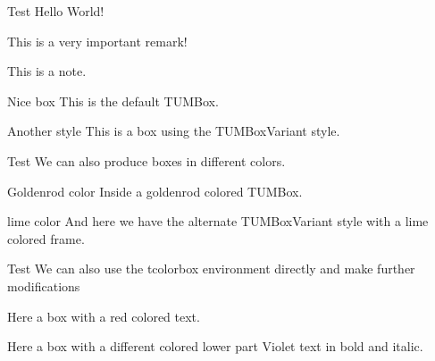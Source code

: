 

\begin{frame}[t]{Test}
  Hello World!
  \begin{tcolorbox}[TUMBoxFill=TUMOrange, title=Attention]
    This is a very important remark!
  \end{tcolorbox}
  \begin{tcolorbox}[TUMBoxFill=TUMGreen, title=Note]
    This is a note.
  \end{tcolorbox}

  \begin{TUMBox}{Nice box}
    This is the default TUMBox.
  \end{TUMBox}
  \begin{TUMBoxVariant}{Another style}
    This is a box using the TUMBoxVariant style.
  \end{TUMBoxVariant}
\end{frame}


\begin{frame}[t]{Test}
  We can also produce boxes in different colors.
  \begin{TUMBox}[TUMExtGoldenrod]{Goldenrod color}
    Inside a goldenrod colored TUMBox.
  \end{TUMBox}
  \begin{TUMBoxVariant}[TUMExtLime]{lime color}
    And here we have the alternate TUMBoxVariant style with a lime colored
    frame.
  \end{TUMBoxVariant}
\end{frame}


\begin{frame}[t]{Test}
  We can also use the tcolorbox environment directly and make further
  modifications
  \begin{tcolorbox}[title=Colored text, TUMBox=TUMExtNavy, coltext=TUMExtRed]
    Here a box with a red colored text.
  \end{tcolorbox}
  \begin{tcolorbox}[title=Modified lower part, TUMBoxVariant=TUMExtForest,
      collower=TUMExtViolet, fontlower=\sffamily\bfseries\itshape]
    Here a box with a different colored lower part
    \tcblower
    Violet text in bold and italic.
  \end{tcolorbox}
\end{frame}


